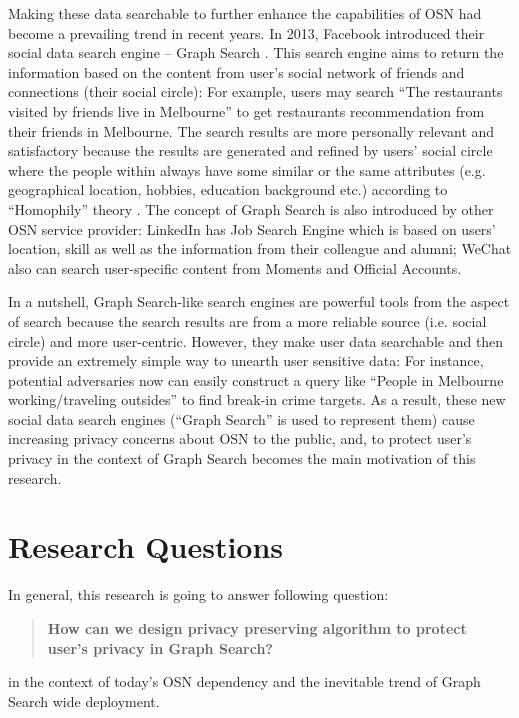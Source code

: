 Making these data searchable to further enhance the capabilities of OSN had become a prevailing trend in recent years. In 2013, Facebook introduced their social data search engine -- Graph Search \cite{facebook2013graph}. This search engine aims to return the information based on the content from user's social network of friends and connections (their social circle): For example, users may search ``The restaurants visited by friends live in Melbourne'' to get restaurants recommendation from their friends in Melbourne. The search results are more personally relevant and satisfactory because the results are generated and refined by users' social circle where the people within always have some similar or the same attributes (e.g. geographical location, hobbies, education background etc.) according to ``Homophily'' theory \cite{mcpherson2001birds}. The concept of Graph Search is also introduced by other OSN service provider: LinkedIn has Job Search Engine which is based on users' location, skill as well as the information from their colleague and alumni; WeChat also can search user-specific content from Moments and Official Accounts. 

In a nutshell, Graph Search-like search engines are powerful tools from the aspect of search because the search results are from a more reliable source (i.e. social circle) and more user-centric. However, they make user data searchable and then provide an extremely simple way to unearth user sensitive data: For instance, potential adversaries now can easily construct a query like ``People in Melbourne working/traveling outsides'' to find break-in crime targets. As a result, these new social data search engines (``Graph Search'' is used to represent them) cause increasing privacy concerns about OSN to the public, and, to protect user's privacy in the context of Graph Search becomes the main motivation of this research.

\section{Research Questions}
In general, this research is going to answer following question:
\begin{quotation}
{ \bf How can we design privacy preserving algorithm to protect user's privacy in Graph Search?}
\end{quotation}
in the context of today's OSN dependency and the inevitable trend of Graph Search wide deployment.

